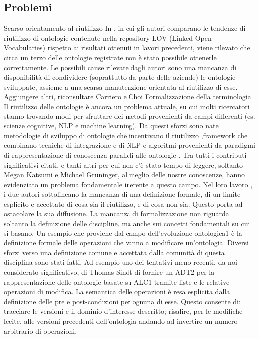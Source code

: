 \subsection{Problemi}
Scarso orientamento al riutilizzo In \cite{...}, in cui gli autori comparano le tendenze di riutilizzo di ontologie contenute nella repository LOV (Linked Open Vocabularies) rispetto ai risultati ottenuti in lavori precedenti, viene rilevato che circa un terzo delle ontologie registrate non è stato possibile ottenerle correttamente. Le possibili cause rilevate dagli autori sono una mancanza di disponibilità di condividere (soprattutto da parte delle aziende) le ontologie sviluppate, assieme a una scarsa manutenzione orientata al riutilizzo di esse.
Aggiungere altri, riconsultare Carriero e Choi
Formalizzazione della terminologia
Il riutilizzo delle ontologie è ancora un problema attuale, su cui molti ricercatori stanno trovando modi per sfruttare dei metodi provenienti da campi differenti (es. scienze cognitive, NLP e machine learning). Da questi sforzi sono nate metodologie di sviluppo di ontologie che incentivano il riutilizzo \cite{...},framework che combinano tecniche di integrazione e di NLP \cite{...} e algoritmi provenienti da paradigmi di rappresentazione di conoscenza paralleli alle ontologie \cite{...}. Tra tutti i contributi significativi citati, e tanti altri per cui non c'è stato tempo di leggere, soltanto Megan Katsumi e Michael Grüninger, al meglio delle nostre conoscenze, hanno evidenziato un problema fondamentale inerente a questo campo. Nel loro lavoro \cite{...}, i due autori sottolineano la mancanza di una definizione formale, di un limite esplicito e accettato di cosa sia il riutilizzo, e di cosa non sia. Questo porta ad ostacolare la sua diffusione. La mancanza di formalizzazione non riguarda soltanto la definizione delle discipline, ma anche sui concetti fondamentali su cui si basano. Un esempio che proviene dal campo dell'evoluzione ontologica1 è la definizione formale delle operazioni che vanno a modificare un'ontologia. Diversi sforzi verso una definizione comune e accettata dalla comunità di questa disciplina sono stati fatti. Ad esempio uno dei tentativi meno recenti, da noi considerato significativo, di Thomas Sindt \cite{...} di fornire un ADT2 per la rappresentazione delle ontologie basate su ALC1 tramite liste e le relative operazioni di modifica. La semantica delle operazioni è resa esplicita dalla definizione delle pre e post-condizioni per ognuna di esse. Questo consente di:
tracciare le versioni e il dominio d'interesse descritto;
risalire, per le modifiche lecite, alle versioni precedenti dell'ontologia andando ad invertire un numero arbitrario di operazioni.
